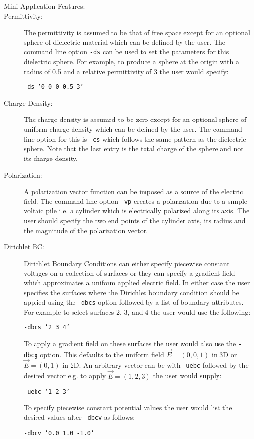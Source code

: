 \documentclass{article}
\begin{document}
\begin{description}
\item[Mini Application Features:]
\item[Permittivity:] The permittivity is assumed to be that of free
  space except for an optional sphere of dielectric material which can
  be defined by the user.  The command line option {\tt -ds} can be
  used to set the parameters for this dielectric sphere.  For example,
  to produce a sphere at the origin with a radius of 0.5 and a
  relative permittivity of 3 the user would specify:
  \begin{center}{\tt -ds '0 0 0 0.5 3'}\end{center}

\item[Charge Density:] The charge density is assumed to be zero except
  for an optional sphere of uniform charge density which can be
  defined by the user.  The command line option for this is {\tt -cs}
  which follows the same pattern as the dielectric sphere.  Note that
  the last entry is the total charge of the sphere and not its charge
  density.

\item[Polarization:] A polarization vector function can be imposed as
  a source of the electric field.  The command line option {\tt -vp}
  creates a polarization due to a simple voltaic pile i.e. a cylinder
  which is electrically polarized along its axis.  The user should
  specify the two end points of the cylinder axis, its radius and the
  magnitude of the polarization vector.

\item[Dirichlet BC:] Dirichlet Boundary Conditions can either specify
  piecewise constant voltages on a collection of surfaces or they can
  specify a gradient field which approximates a uniform applied
  electric field.  In either case the user specifies the surfaces
  where the Dirichlet boundary condition should be applied using the
  {\tt -dbcs} option followed by a list of boundary attributes.
  For example to select surfaces 2, 3, and 4 the user would use the
  following:
  \begin{center}{\tt -dbcs '2 3 4'}\end{center}
  To apply a gradient field on these surfaces the
  user would also use the {\tt -dbcg} option.  This defaults to the
  uniform field $\vec{E}=(0,0,1)$ in 3D or $\vec{E}=(0,1)$ in 2D.  An
  arbitrary vector can be with {\tt -uebc} followed by the desired
  vector e.g. to apply $\vec{E}=(1,2,3)$ the user would supply:
  \begin{center}{\tt -uebc '1 2 3'}\end{center}
  To specify piecewise constant potential values the user would list
  the desired values after {\tt -dbcv} as follows:
  \begin{center}{\tt -dbcv '0.0 1.0 -1.0'}\end{center}


\end{description}
\end{document}
